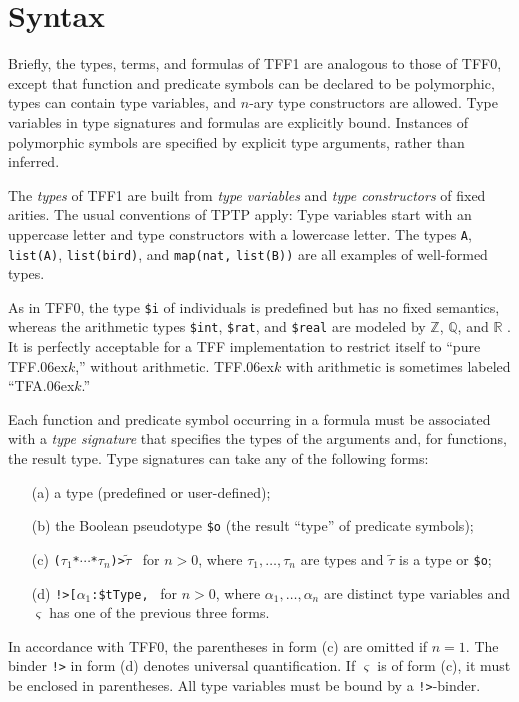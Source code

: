 \section{Syntax} \label{sec_syntax}

Briefly, the types, terms, and formulas of TFF1 are analogous to those of TFF0,
except that function and predicate symbols can be declared to be polymorphic,
types can contain type variables, and $n$-ary type constructors are allowed.
Type variables in type signatures and formulas are explicitly bound. Instances of
polymorphic symbols are specified by explicit type arguments, rather than
inferred.

 The {\em types\/} of TFF1 are built from {\em type
variables\/} and {\em type constructors\/} of fixed arities.
The usual conventions of TPTP
apply: Type variables start with an uppercase letter and type constructors
with a lowercase letter. The types \verb+A+, \verb+list(A)+, \verb+list(bird)+,
and \verb+map(nat,+ \verb+list(B))+ are all examples of well-formed types.

As in TFF0, the type {\tt \$i} %
of individuals is predefined but has no fixed semantics, whereas the
arithmetic types
{\tt \$int}, {\tt \$rat}, and {\tt \$real} are modeled by $\mathbb{Z}$,
$\mathbb{Q}$, and $\mathbb{R}$ \cite{sutcliffe-et-al-2012-tff0}.
It is perfectly acceptable for a TFF
implementation to restrict itself to ``pure TFF\kern.06ex$k$,''
without arithmetic. %
TFF\kern.06ex$k$ with arithmetic is sometimes labeled ``TFA\kern.06ex$k$.''

Each function and predicate symbol occurring in a formula must be associated
with a {\em type signature\/} that specifies the types of the arguments and, for
functions, the result type. Type signatures can take any of the following forms:
%
\begin{enumerate}
\item[(a)] a type (predefined or user-defined);
\item[(b)] the Boolean pseudotype {\tt \$o}  (the result ``type'' of predicate symbols);
\item[(c)] {\tt ($\tau_1$\;*\;${\cdots}$\;*\;$\tau_n$)\;>\;$\tilde \tau$}
\ for $n > 0$, where $\tau_1,\dots,\tau_n$ are types and $\tilde \tau$ is
a type or {\tt \$o};
\item[(d)] {\tt !>[$\alpha_1$\;:\;\$tType,}\;{\tt ${\dots}$,}\;{\tt
$\alpha_n$\;:\;\$tType]:\;$\varsigma$}
\ for $n > 0$, where $\alpha_1,\dots,\alpha_n$ are distinct
type variables and $\varsigma$ has one of the previous three forms.
\end{enumerate}
%
In accordance with TFF0, the parentheses in form (c) are omitted if $n = 1$.
The binder {\tt !>} in form (d) denotes universal quantification.
If $\varsigma$ is of form (c), it must be enclosed in parentheses.
All type variables must be bound by a {\tt !>}-binder.

